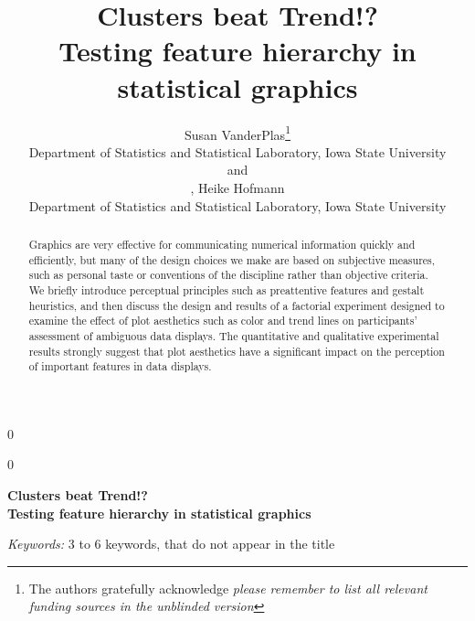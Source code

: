 \documentclass[12pt]{article}\usepackage[]{graphicx}\usepackage[]{color}
\newcommand{\blind}{0}
\begin{document}
%

\def\spacingset#1{\renewcommand{\baselinestretch}%
{#1}\small\normalsize} \spacingset{1}



\blind
{
  \title{\bf Clusters beat Trend!? \\Testing feature hierarchy in statistical graphics}
  \author{Susan VanderPlas\thanks{
    The authors gratefully acknowledge \textit{please remember to list all relevant funding sources in the unblinded version}}\hspace{.2cm}\\
    Department of Statistics and Statistical Laboratory, Iowa State University\\
    and \\
    , Heike Hofmann\\
    Department of Statistics and Statistical Laboratory, Iowa State University}
  \maketitle
} \fi

\blind
{
  \bigskip
  \bigskip
  \bigskip
  \begin{center}
    {\LARGE\bf Clusters beat Trend!? \\Testing feature hierarchy in statistical graphics}
\end{center}
  \medskip
} \fi

\bigskip
\begin{abstract}
Graphics are very effective for communicating numerical information quickly and efficiently, but many of the design choices we make are based on subjective measures, such as personal taste or conventions of the discipline rather than objective criteria. We briefly introduce perceptual principles such as preattentive features and gestalt heuristics, and then discuss the design and results of a factorial experiment designed to examine the effect of plot aesthetics such as color and trend lines on participants' assessment of ambiguous data displays. The quantitative and qualitative experimental results strongly suggest that plot aesthetics have a significant impact on the perception of important features in data displays. 
\end{abstract}

\noindent%
{\it Keywords:}  3 to 6 keywords, that do not appear in the title
\vfill
\end{document}
